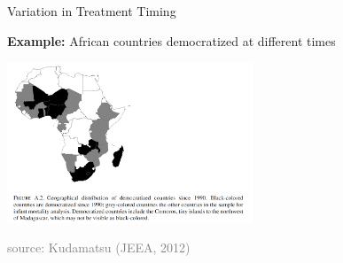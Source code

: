 \documentclass[10pt,xcolor=table,ignorenonframetext,handout,aspectratio=169]{beamer}
\begin{document}

\newpage
\begin{frame}{Variation in Treatment Timing}

\medskip

\begin{center}

\textbf{Example:}  African countries democratized at different times

\medskip
\medskip

\includegraphics[height=4.8cm]{img/Kudamatsu-map.pdf} 

\smallskip

\tiny{\textcolor{gray}{source:  Kudamatsu (JEEA, 2012)}}
\end{center}

\end{frame}


\end{document}
